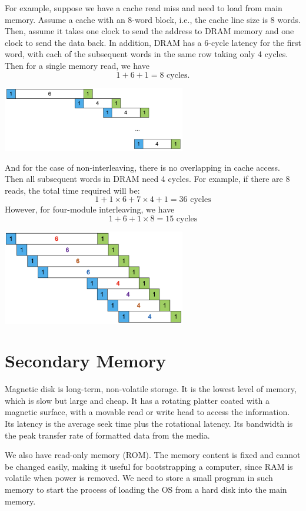For example, suppose we have a cache read miss and need to load from main memory. Assume a cache with an 8-word block, i.e., the cache line size is 8 words. Then, assume it takes one clock to send the address to DRAM memory and one clock to send the data back. In addition, DRAM has a 6-cycle latency for the first word, with each of the subsequent words in the same row taking only 4 cycles. Then for a single memory read, we have 
\[
1 + 6 + 1 = 8 \text{ cycles}.
\]
\begin{center}
  \includegraphics[width=0.6\textwidth]{Figure/overleaving_1.png}
\end{center}
And for the case of non-interleaving, there is no overlapping in cache access. Then all subsequent words in DRAM need 4 cycles. For example, if there are 8 reads, the total time required will be:
\[
  1 + 1 \times 6 + 7 \times 4 + 1 = 36 \text{ cycles}
\]
However, for four-module interleaving, we have 
\[
  1 + 6 + 1 \times 8 = 15 \text{ cycles}
\]
\begin{center}
  \includegraphics[width=0.6\textwidth]{Figure/overleaving_2.png}
\end{center}

\section{Secondary Memory}
Magnetic disk is long-term, non-volatile storage. It is the lowest level of memory, which is slow but large and cheap. It has a rotating platter coated with a magnetic surface, with a movable read or write head to access the information. Its latency is the average seek time plus the rotational latency. Its bandwidth is the peak transfer rate of formatted data from the media.

We also have read-only memory (ROM). The memory content is fixed and cannot be changed easily, making it useful for bootstrapping a computer, since RAM is volatile when power is removed. We need to store a small program in such memory to start the process of loading the OS from a hard disk into the main memory.

